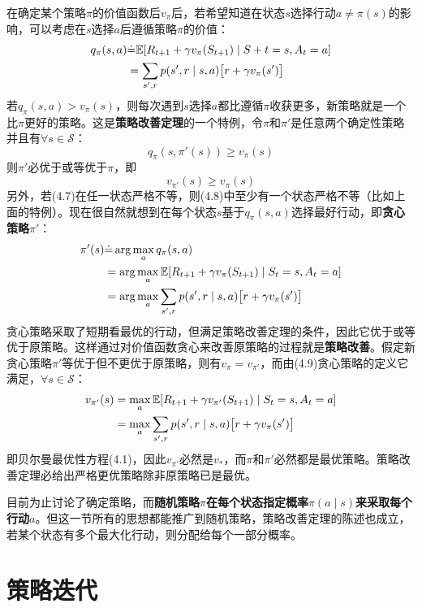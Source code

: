 \documentclass{ctexart}
\begin{document}
在确定某个策略$\pi$的价值函数后$v_\pi$后，若希望知道在状态$s$选择行动$a \neq \pi(s)$的影响，可以考虑在$s$选择$a$后遵循策略$\pi$的价值：
\begin{align}
q_\pi(s,a)
&\dot= \mathbb E[R_{t+1}+\gamma v_\pi(S_{t+1}) \mid S+t=s,A_t=a] \\
&= \sum_{s',r} p(s',r \mid s,a)\bigl[ r+\gamma v_\pi(s') \bigr] \notag
\end{align}
若$q_\pi(s,a) > v_\pi(s)$，则每次遇到$s$选择$a$都比遵循$\pi$收获更多，新策略就是一个比$\pi$更好的策略。这是\textbf{策略改善定理}的一个特例，令$\pi$和$\pi'$是任意两个确定性策略并且有$\forall s \in \mathcal S$：
\begin{equation}
q_\pi(s,\pi'(s)) \ge v_\pi(s)
\end{equation}
则$\pi'$必优于或等优于$\pi$，即
\begin{equation}
v_{\pi'}(s) \ge v_\pi(s)
\end{equation}
另外，若(4.7)在任一状态严格不等，则(4.8)中至少有一个状态严格不等（比如上面的特例）。现在很自然就想到在每个状态$s$基于$q_\pi(s,a)$选择最好行动，即\textbf{贪心策略}$\pi'$：
\begin{align}
\pi'(s)
&\dot= \arg\max_a q_\pi(s,a) \notag\\
&= \arg\max_a \mathbb E[R_{t+1}+\gamma v_\pi(S_{t+1}) \mid S_t=s,A_t=a] \\
&= \arg\max_a \sum_{s',r} p(s',r \mid s,a)\bigl[ r+\gamma v_\pi(s') \bigr] \notag
\end{align}
贪心策略采取了短期看最优的行动，但满足策略改善定理的条件，因此它优于或等优于原策略。这样通过对价值函数贪心来改善原策略的过程就是\textbf{策略改善}。假定新贪心策略$\pi'$等优于但不更优于原策略，则有$v_\pi=v_{\pi'}$，而由(4.9)贪心策略的定义它满足，$\forall s\in\mathcal S$：
\begin{align}
v_{\pi'}(s)
&= \max_a\mathbb E[R_{t+1}+\gamma v_{\pi'}(S_{t+1}) \mid S_t=s,A_t=a] \notag\\
&= \max_a \sum_{s',r} p(s',r \mid s,a)\bigl[ r+\gamma v_\pi(s') \bigr] \notag
\end{align}
即贝尔曼最优性方程(4.1)，因此$v_{\pi'}$必然是$v_*$，而$\pi$和$\pi'$必然都是最优策略。策略改善定理必给出严格更优策略除非原策略已是最优。

目前为止讨论了确定策略，而\textbf{随机策略$\pi$在每个状态指定概率$\pi(a\mid s)$来采取每个行动$a$}。但这一节所有的思想都能推广到随机策略，策略改善定理的陈述也成立，若某个状态有多个最大化行动，则分配给每个一部分概率。



\section{策略迭代}
\end{document}
